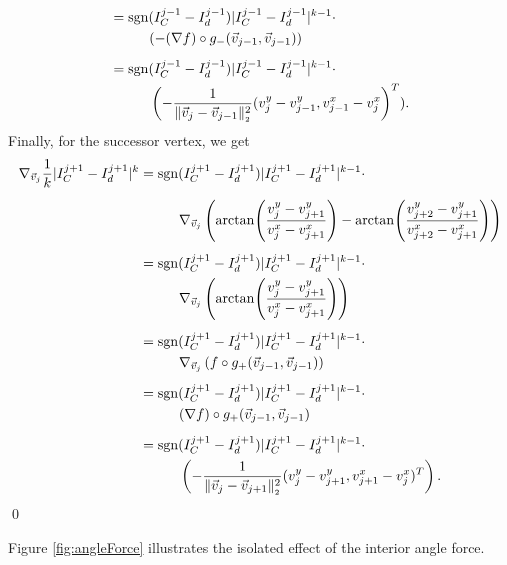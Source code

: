 \begin{proposition}
\begin{align*}
		&= \sgn(I^{j-1}_{C} - I^{j-1}_d)|I^{j-1}_{C} - I^{j-1}_d|^{k-1} \cdot \\
		&\hspace{1cm} (- (\nabla f) \circ g_{-}(\vec{v}_{j-1}, \vec{v}_{j-1})) \\[0.5em]
		&= \sgn(I^{j-1}_{C} - I^{j-1}_d)|I^{j-1}_{C} - I^{j-1}_d|^{k-1} \cdot \\
		&\hspace{1cm} \left(- \frac{1}{\norm[\vec{v}_j - \vec{v}_{j-1}]^2} (v_j^y - v_{j-1}^y, v_{j-1}^x - v_j^x \right)^T).		
	\end{align*}
	Finally, for the successor vertex, we get 
	\begin{align*}
		\nabla_{\vec{v}_j} \frac{1}{k}| I^{j+1}_{C} - I^{j+1}_d |^k 
		&= \sgn(I^{j+1}_{C} - I^{j+1}_d)|I^{j+1}_{C} - I^{j+1}_d|^{k-1} \cdot \\[0.5em]
		&\hspace{1cm} \nabla_{\vec{v}_j} \left(\arctan\!\left(\frac{v_{j}^{y} - v_{j+1}^{y}}{v_{j}^{x} - v_{j+1}^{x}}\right) - \arctan\!\left(\frac{v_{j+2}^{y} - v_{j+1}^{y}}{v_{j+2}^{x} - v_{j+1}^{x}}\right)\right) \\[0.5em]
		&= \sgn(I^{j+1}_{C} - I^{j+1}_d)|I^{j+1}_{C} - I^{j+1}_d|^{k-1} \cdot \\
		&\hspace{1cm} \nabla_{\vec{v}_j} \left(\arctan\!\left(\frac{v_{j}^{y} - v_{j+1}^{y}}{v_{j}^{x} - v_{j+1}^{x}}\right)\right) \\[0.5em]
		&= \sgn(I^{j+1}_{C} - I^{j+1}_d)|I^{j+1}_{C} - I^{j+1}_d|^{k-1} \cdot \\
		&\hspace{1cm} \nabla_{\vec{v}_j} \left( f \circ g_{+}(\vec{v}_{j-1}, \vec{v}_{j-1}) \right) \\[0.5em]
		&= \sgn(I^{j+1}_{C} - I^{j+1}_d)|I^{j+1}_{C} - I^{j+1}_d|^{k-1} \cdot \\
		&\hspace{1cm} (\nabla f) \circ g_{+}(\vec{v}_{j-1}, \vec{v}_{j-1}) \\[0.5em]
		&= \sgn(I^{j+1}_{C} - I^{j+1}_d)|I^{j+1}_{C} - I^{j+1}_d|^{k-1} \cdot \\
		&\hspace{1cm} \left(- \frac{1}{\norm[\vec{v}_j - \vec{v}_{j+1}]^2} (v_j^y - v_{j+1}^y, v_{j+1}^x - v_j^x)^T \right).	
	\end{align*}
	\qed
\end{proposition}

Figure \ref{fig:angleForce} illustrates the isolated effect of the interior angle force.

